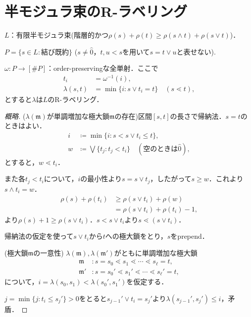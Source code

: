 \documentclass[xelatex,ja=standard,a4paper,14pt,everyparhook=compat]{bxjsarticle}
\newcommand{\mkm}{\mathfrak{m}}
\theoremstyle{definition}
\begin{document}
\section{半モジュラ束のR-ラベリング}

$L$：有限半モジュラ束(階層的かつ$\rho(s) + \rho(t) \geq \rho(s \land t) + \rho(s \vee t)$)．

$P = \{s \in L : \text{結び既約}\}$ ($s \neq \hat0$，$t,u < s$を用いて$s = t \vee u$と表せない).

$\omega: P \to [\#P]$：order-preservingな全単射．ここで \begin{align*}
    t_i          & = \omega^{-1}(i),                                  \\
    \lambda(s,t) & = \min\{i : s \vee t_i = t\} \quad (s \lessdot t),
\end{align*}
とすると$\lambda$は$L$のR-ラベリング．

\begin{proof}[概略]
    ($\lambda(\mkm)$が単調増加な極大鎖$\mkm$の存在)区間$[s,t]$の長さで帰納法．$s = t$のときはよい．
    \begin{align*}
        i & \coloneqq \min \{i : s < s \vee t_i \leq t\},                           \\
        w & \coloneqq \bigvee \{t_j : t_j < t_i\} \quad (\text{空のときは$\hat0$}),
    \end{align*}
    とすると，$w \lessdot t_i$．

    また各$t_j < t_i$について，$i$の最小性より$s = s \vee t_j$，したがって$s \geq w$．これより$s \wedge t_i = w$．
    \begin{align*}
        \rho(s) + \rho(t_i) & \geq \rho(s \vee t_i) + \rho(w)     \\
                            & = \rho(s \vee t_i) + \rho(t_i) - 1,
    \end{align*}
    より$\rho(s) + 1 \geq \rho(s \vee t_i)$．$s < s \vee t_i$より$s \lessdot (s \vee t_i)$．

    帰納法の仮定を使って$s \vee t_i$から$t$への極大鎖をとり，$s$をprepend．

    (極大鎖$\mkm$の一意性) $\lambda(\mkm), \lambda(\mkm')$がともに単調増加な極大鎖 \begin{align*}
        \mkm  & : s = s_0 \lessdot s_1 \lessdot \cdots \lessdot s_\ell = t,    \\
        \mkm' & : s = s_0' \lessdot s_1' \lessdot \cdots \lessdot s_\ell' = t,
    \end{align*}
    について，$i = \lambda(s_0, s_1) < \lambda(s_0', s_1')$を仮定する．

    $j = \min \{j : t_i \leq s_j'\} > 0$をとると$s_{j-1}' \vee t_i = s_j'$より$\lambda(s_{j-1}', s_j') \leq i$，矛盾．
\end{proof}
\end{document}
